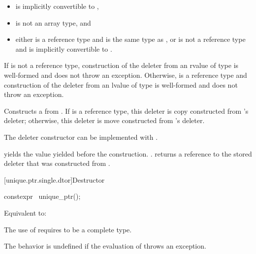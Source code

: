\begin{itemdescr}
\pnum
\constraints
\begin{itemize}
\item {} is implicitly convertible to ,
\item {} is not an array type, and
\item either  is a reference type and  is the same type as , or
 is not a reference type and  is implicitly convertible to .
\end{itemize}

\pnum
\expects
If  is not a reference type,
construction of the deleter from an rvalue of type 
is well-formed and does not throw an exception.
Otherwise,  is a reference type and
construction of the deleter from an lvalue of type 
is well-formed and does not throw an exception.

\pnum
\effects
Constructs a  from .
If  is a reference type, this deleter is copy constructed from
's deleter; otherwise, this deleter is move constructed from 's
deleter.
\begin{note}
The deleter constructor can be implemented with
.
\end{note}

\pnum
\ensures
{} yields the value 
yielded before the construction. .
 returns a reference
to the stored deleter that was constructed from
.
\end{itemdescr}

[unique.ptr.single.dtor]{Destructor}

%
\begin{itemdecl}
constexpr ~unique_ptr();
\end{itemdecl}

\begin{itemdescr}
\pnum
\effects
Equivalent to:
\begin{note}
The use of  requires  to be a complete type.
\end{note}

\pnum
\remarks
The behavior is undefined
if the evaluation of  throws an exception.
\end{itemdescr}

